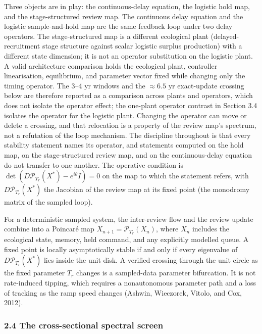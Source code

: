 \documentclass[11pt]{article}
\begin{document}
Three objects are in play: the continuous-delay equation, the logistic
hold map, and the stage-structured review map. The continuous delay
equation and the logistic sample-and-hold map are the same feedback loop
under two delay operators. The stage-structured map is a different
ecological plant (delayed-recruitment stage structure against scalar
logistic surplus production) with a different state dimension; it is not
an operator substitution on the logistic plant. A valid architecture
comparison holds the ecological plant, controller linearisation,
equilibrium, and parameter vector fixed while changing only the timing
operator. The 3--4 yr windows and the \(\approx 6.5\) yr exact-update crossing below
are therefore reported as a comparison across plants and operators, which does not isolate the operator effect; the one-plant operator contrast in Section 3.4 isolates the operator for the logistic plant. Changing the
operator can move or delete a crossing, and that relocation is a
property of the review map's spectrum, not a refutation of the loop mechanism. The
discipline throughout is that every stability statement names its
operator, and statements computed on the hold map, on the
stage-structured review map, and on the continuous-delay equation do not
transfer to one another. The operative condition is
\(\det(D\mathcal P_{T_r}(X^*)-e^{i\theta}I)=0\) on the map to which the
statement refers, with \(D\mathcal P_{T_r}(X^*)\) the Jacobian of the
review map at its fixed point (the monodromy matrix of the sampled
loop).

For a deterministic sampled system, the inter-review flow and the review
update combine into a Poincar\'e map \(X_{n+1}=\mathcal P_{T_r}(X_n)\),
where \(X_n\) includes the ecological state, memory, held command, and
any explicitly modelled queue. A fixed point is locally asymptotically
stable if and only if every eigenvalue of \(D\mathcal P_{T_r}(X^*)\)
lies inside the unit disk. A verified crossing through the unit circle
as the fixed parameter \(T_r\) changes is a sampled-data parameter
bifurcation. It is not rate-induced tipping, which requires a
nonautonomous parameter path and a loss of tracking as the ramp speed
changes (Ashwin, Wieczorek, Vitolo, and Cox, 2012).

\subsubsection{2.4 The cross-sectional spectral
screen}\label{the-cross-sectional-spectral-screen}
\end{document}
